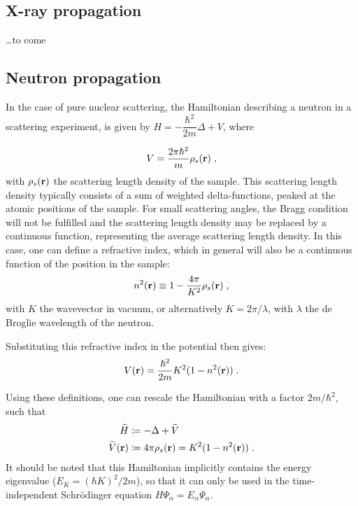 \subsection{X-ray propagation}

\ldots to come

\subsection{Neutron propagation}

In the case of pure nuclear scattering, the Hamiltonian describing a neutron in a scattering experiment, is given by $H = -\dfrac{\hbar^2}{2m}\Delta + V$, where

\begin{equation*}
  V = \frac{2\pi \hbar^2}{m}\rho_s(\mathbf{r}) \; ,
\end{equation*}
with $\rho_s(\mathbf{r})$ the scattering length density of the sample. This scattering length density typically consists of a sum of weighted delta-functions, peaked at the atomic positions of the sample. For small scattering angles, the Bragg condition will not be fulfilled and the scattering length density may be replaced by a continuous function, representing the average scattering length density. In this case, one can define a refractive index, which in general will also be a continuous function of the position in the sample:
\begin{equation*}
  n^2(\mathbf{r}) \equiv 1 - \frac{4\pi}{K^2}\rho_s(\mathbf{r}) \; ,
\end{equation*}
with $K$ the wavevector in vacuum, or alternatively $K = 2\pi /\lambda$, with $\lambda$ the de Broglie wavelength of the neutron.


Substituting this refractive index in the potential then gives:
\begin{equation*}
  V(\mathbf{r}) = \frac{\hbar^2}{2m}K^2(1-n^2(\mathbf{r})) \; .
\end{equation*}

Using these definitions, one can rescale the Hamiltonian with a factor $2m/\hbar^2$, such that
\begin{align*}
  \widetilde{H} &\coloneqq -\Delta + \widetilde{V} \nonumber \\
  \widetilde{V}(\mathbf{r}) &\coloneqq 4\pi\rho_s(\mathbf{r}) = K^2(1-n^2(\mathbf{r})) \; .
\end{align*}
It should be noted that this Hamiltonian implicitly contains the energy eigenvalue ($E_{K}=(\hbar K)^2/2m$), so that it can only be used in the time-independent Schr\"odinger equation $H\Psi_\alpha = E_\alpha \Psi_\alpha$.

